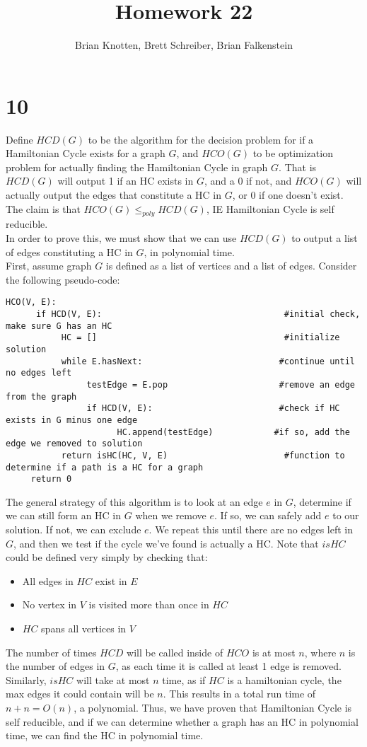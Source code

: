 \documentclass[letterpaper,notitlepage,twoside]{article}
\begin{document}
\title{Homework 22}
\author{Brian Knotten, Brett Schreiber, Brian Falkenstein}
\maketitle
\section*{10}
Define $HCD(G)$ to be the algorithm for the decision problem for if a Hamiltonian Cycle exists for a graph $G$, and $HCO(G)$ to be optimization problem for actually finding the Hamiltonian Cycle in graph $G$. That is $HCD(G)$ will output 1 if an HC exists in $G$, and a 0 if not, and $HCO(G)$ will actually output the edges that constitute a HC in $G$, or 0 if one doesn't exist. The claim is that $HCO(G) \leq _{poly} HCD(G)$, IE Hamiltonian Cycle is self reducible. \\
In order to prove this, we must show that we can use $HCD(G)$ to output a list of edges constituting a HC in $G$, in polynomial time. \\
First, assume graph $G$ is defined as a list of vertices and a list of edges. Consider the following pseudo-code: 
\begin{verbatim}
HCO(V, E):
      if HCD(V, E):                                    #initial check, make sure G has an HC
           HC = []                                     #initialize solution 
           while E.hasNext:                           #continue until no edges left 
                testEdge = E.pop                      #remove an edge from the graph
                if HCD(V, E):                         #check if HC exists in G minus one edge
                      HC.append(testEdge)            #if so, add the edge we removed to solution
           return isHC(HC, V, E)                       #function to determine if a path is a HC for a graph
     return 0

\end{verbatim}
The general strategy of this algorithm is to look at an edge $e$ in $G$, determine if we can still form an HC in $G$ when we remove $e$. If so, we can safely add $e$ to our solution. If not, we can exclude $e$. We repeat this until there are no edges left in $G$, and then we test if the cycle we've found is actually a HC. Note that $isHC$ could be defined very simply by checking that:
\begin{itemize}
\item All edges in $HC$ exist in $E$
\item No vertex in $V$ is visited more than once in $HC$
\item $HC$ spans all vertices in $V$
\end{itemize}
The number of times $HCD$ will be called inside of $HCO$ is at most $n$, where $n$ is the number of edges in $G$, as each time it is called at least 1 edge is removed. Similarly, $isHC$ will take at most $n$ time, as if $HC$ is a hamiltonian cycle, the max edges it could contain will be $n$. This results in a total run time of $n + n = O(n)$, a polynomial. Thus, we have proven that Hamiltonian Cycle is self reducible, and if we can determine whether a graph has an HC in polynomial time, we can find the HC in polynomial time.  
\end{document}
